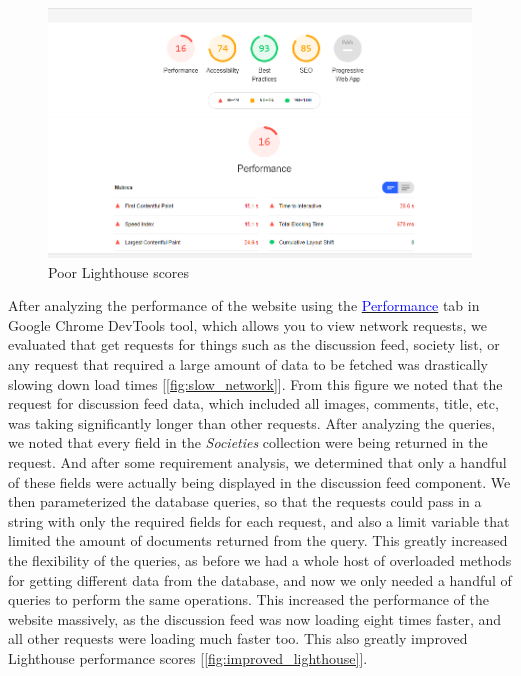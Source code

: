 \begin{figure}[H]
  \centering
  \includegraphics[scale=0.65]{img/lighthouse_poor_cropped.jpg}
  \caption{Poor Lighthouse scores}
  \label{fig:poor_lighthouse}
\end{figure}

After analyzing the performance of the website using the \href{https://developer.chrome.com/docs/devtools/evaluate-performance/}{\textcolor{blue}{Performance}} tab in Google Chrome DevTools tool, which allows you to view network requests, we evaluated that get requests for things such as the discussion feed, society list, or any request that required a large amount of data to be fetched was drastically slowing down load times [\ref{fig:slow_network}]. From this figure we noted that the request for discussion feed data, which included all images, comments, title, etc, was taking significantly longer than other requests. After analyzing the queries, we noted that every field in the \textit{Societies} collection were being returned in the request. And after some requirement analysis, we determined that only a handful of these fields were actually being displayed in the discussion feed component. We then parameterized the database queries, so that the requests could pass in a string with only the required fields for each request, and also a limit variable that limited the amount of documents returned from the query. This greatly increased the flexibility of the queries, as before we had a whole host of overloaded methods for getting different data from the database, and now we only needed a handful of queries to perform the same operations. This increased the performance of the website massively, as the discussion feed was now loading eight times faster, and all other requests were loading much faster too. This also greatly improved Lighthouse performance scores [\ref{fig:improved_lighthouse}].

